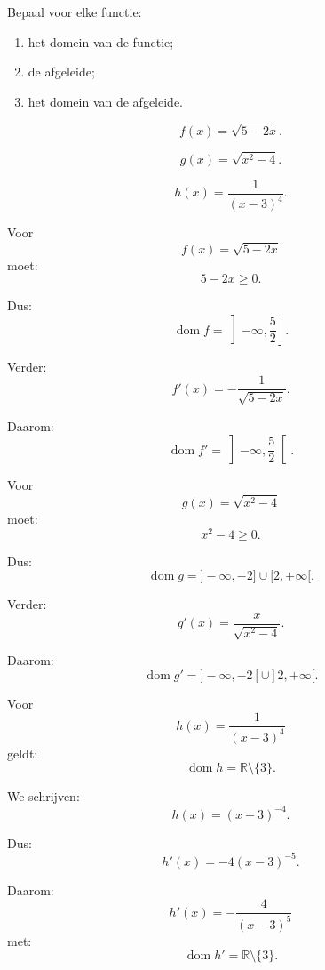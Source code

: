 \documentclass{ximera}
\begin{document}
\begin{oefening}{\oefB\ESS}

Bepaal voor elke functie:
\begin{enumerate}
  \item het domein van de functie;
  \item de afgeleide;
  \item het domein van de afgeleide.
\end{enumerate}

\begin{question}
\[f(x)=\sqrt{5-2x}.\]
\end{question}

\begin{question}
\[g(x)=\sqrt{x^2-4}.\]
\end{question}

\begin{question}
\[h(x)=\frac{1}{(x-3)^4}.\]
\end{question}

\begin{oplossing}

Voor
\[f(x)=\sqrt{5-2x}\]
moet:
\[5-2x\geq0.\]

Dus:
\[\operatorname{dom}f=\left]-\infty,\frac52\right].\]

Verder:
\[f'(x)=-\frac{1}{\sqrt{5-2x}}.\]

Daarom:
\[\operatorname{dom}f'=\left]-\infty,\frac52\right[.\]

Voor
\[g(x)=\sqrt{x^2-4}\]
moet:
\[x^2-4\geq0.\]

Dus:
\[\operatorname{dom}g=]-\infty,-2]\cup[2,+\infty[.\]

Verder:
\[g'(x)=\frac{x}{\sqrt{x^2-4}}.\]

Daarom:
\[\operatorname{dom}g'=]-\infty,-2[\cup]2,+\infty[.\]

Voor
\[h(x)=\frac{1}{(x-3)^4}\]
geldt:
\[\operatorname{dom}h=\mathbb R\setminus\{3\}.\]

We schrijven:
\[h(x)=(x-3)^{-4}.\]

Dus:
\[h'(x)=-4(x-3)^{-5}.\]

Daarom:
\[\boxed{h'(x)=-\frac4{(x-3)^5}}\]
met:
\[\operatorname{dom}h'=\mathbb R\setminus\{3\}.\]

\end{oplossing}

\end{oefening}
\end{document}

